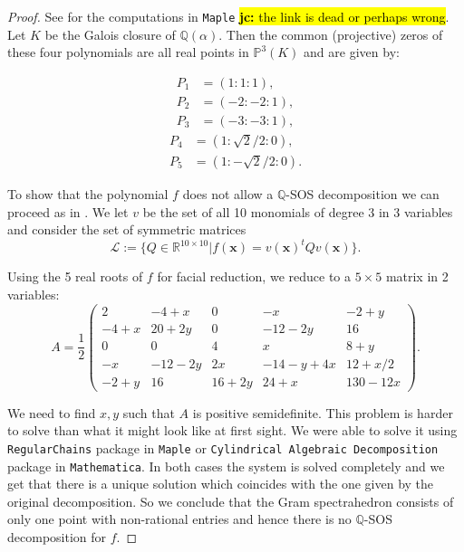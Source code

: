 \documentclass[a4paper,11pt]{amsart}%
\newcommand{\code}[1]{\texttt{#1}}
\newcommand\jc[1]{\hl{{\bf jc:} #1}}
\newcommand\Q{\mathbb{Q}}
\newcommand{\eLL}{{\mathcal L}}
\newcommand\R{\mathbb{R}}
\renewcommand\P{\mathbb{P}}
\theoremstyle{definition}
\begin{document}
\begin{proof} See \cite{worksheets3644} for the computations in \code{Maple} \jc{the link is dead or perhaps wrong}. 
Let $K$ be the Galois closure of $\Q(\alpha)$. Then the common (projective) zeros of these four polynomials are all real points in $\P^3(K)$
and are given by:
\begin{multicols}{2}\noindent
\begin{align*}
P_1 &=(1:1:1),\\
P_2 &= (-2:-2:1),\\
P_3 &= (-3:-3:1),
\end{align*}
\begin{align*}
P_4 &= (1: \sqrt 2/2: 0),\\
P_5 &= (1: -\sqrt 2/2: 0).
\end{align*}
\end{multicols}

To show that the polynomial $f$ does not allow a $\Q$-SOS decomposition we can proceed as in \cite{laplagne}. We let $v$ be the set of all 10 monomials of degree 3 in 3 variables and consider the set of symmetric matrices $$\eLL := \{Q \in \R^{10 \times 10} | f(\bm x) = v(\bm x)^t Q v(\bm x)\}.$$

Using the 5 real roots of $f$ for facial reduction, we reduce to a $5 \times 5$ matrix in 2 variables:
\[
A = \frac{1}{2}
 \begin{pmatrix}
  2 & -4 + x & 0 & -x  & -2 + y \\
  -4 + x & 20 + 2y & 0 & -12-2y & 16 \\
  0 & 0 & 4 & x & 8 + y \\
  -x & -12 - 2y & 2x & -14 - y + 4x & 12 + x/2 \\
  -2 + y & 16 & 16 + 2y & 24 + x & 130 - 12x
 \end{pmatrix}.
\]

We need to find $x, y$ such that $A$ is positive semidefinite. This problem is harder to solve than what it might look like at first sight.
We were able to solve it using \texttt{RegularChains} \cite{RegularChains} package in \code{Maple} or \code{Cylindrical Algebraic Decomposition} \cite{CylindricalDecomposition} package in  \code{Mathematica}. In both cases the system is solved completely and we get that there is a unique solution which coincides with the one given by the original decomposition. So we conclude that the Gram spectrahedron consists of only one point with non-rational entries and hence there is no $\Q$-SOS decomposition for $f$.

\end{proof}
\end{document}
